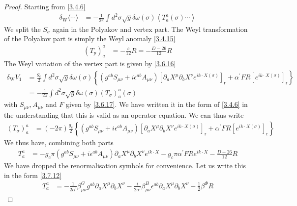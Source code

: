 \begin{tcolorbox}[breakable]
	\begin{proof}
	Starting from \eqref{3.4.6}
	\begin{align}
		\delta_{\mathrm{W}}\langle\cdots\rangle &= -\frac{1}{2 \pi} \int d^2 \sigma \sqrt{g} \delta \omega(\sigma)\left\langle T_a^a(\sigma) \cdots\right\rangle
	\end{align}
	We split the $S_\sigma$ again in the Polyakov and vertex part. The Weyl transformation of the Polyakov part is simply the Weyl anomaly \eqref{3.4.15}
	\begin{align}
		\left(T_p\right)_a^a &= -\frac{c}{12} R = -\frac{D-26}{12} R
	\end{align}
	The Weyl variation of the vertex part is given by \eqref{3.6.16}
	\begin{align}
		\delta_{\mathrm{W}} V_1 &= \frac{g_c}{2} \int d^2 \sigma \sqrt{g} \delta \omega(\sigma)\left\{\left(g^{a b} S_{\mu \nu}+i \epsilon^{a b} A_{\mu \nu}\right)\left[\partial_a X^\mu \partial_b X^\nu e^{i k \cdot X(\sigma)}\right]_{\mathrm{r}} + \alpha^{\prime} F R\left[e^{i k \cdot X(\sigma)}\right]_{\mathrm{r}}\right\} \nonumber \\
		&= -\frac{1}{2 \pi} \int d^2 \sigma \sqrt{g} \delta \omega(\sigma)\left(T_\sigma\right)_a^a(\sigma)
	\end{align}
	with $S_{\mu \nu}, A_{\mu \nu}$ and $F$ given by \eqref{3.6.17}. We have written it in the form of \eqref{3.4.6} in the understanding that this is valid as an operator equation. We can thus write
	\begin{align}
		\left(T_\sigma\right)_a^a &= (-2 \pi) \frac{g_c}{2}\left\{\left(g^{a b} S_{\mu \nu}+i \epsilon^{a b} A_{\mu \nu}\right)\left[\partial_a X^\mu \partial_b X^\nu e^{i k \cdot X(\sigma)}\right]_{\mathrm{r}} + \alpha^{\prime} F R\left[e^{i k \cdot X(\sigma)}\right]_{\mathrm{r}}\right\}
	\end{align}
	We thus have, combining both parts
	\begin{align}
		T_a^a &= -g_c \pi\left(g^{a b} S_{\mu \nu}+i \epsilon^{a b} A_{\mu \nu}\right) \partial_a X^\mu \partial_b X^\nu e^{i k \cdot X} - g_c \pi \alpha^{\prime} F R e^{i k \cdot X} - \frac{D-26}{12} R
	\end{align}
	We have dropped the renormalisation symbols for convenience. Let us write this in the form \eqref{3.7.12}
	\begin{align}
		T_a^a &= -\frac{1}{2 \alpha^{\prime}} \beta_{\mu \nu}^G g^{a b} \partial_a X^\mu \partial_b X^\nu - \frac{i}{2 \alpha^{\prime}} \beta_{\mu \nu}^B \epsilon^{a b} \partial_a X^\mu \partial_b X^\nu - \frac{1}{2} \beta^\Phi R

\end{align}
\end{proof}
\end{tcolorbox}
